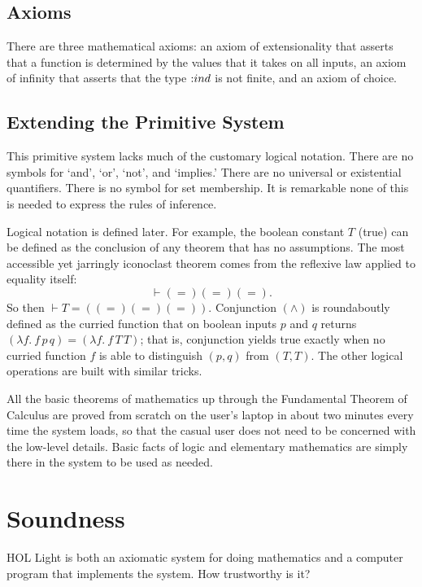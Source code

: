 \documentclass{llncs}
\def\tc{\hbox{:}}
\begin{document}
\subsection{Axioms}

There are three mathematical axioms: an axiom of extensionality that asserts
that a function is determined by the values that it takes on all inputs,
an axiom of infinity that asserts that the type $\tc ind$ is not finite, and an axiom of choice.

\subsection{Extending the Primitive System}

This primitive system 
lacks much of the customary logical notation.
There are no symbols for 
`and', `or', `not', and `implies.'  There are no universal or existential quantifiers.  There is no symbol for set membership.  
It is remarkable none of this is needed to express the rules of inference.

Logical notation
is defined later.
For example, the boolean constant $T$ (true) can be defined as the conclusion of
any theorem that has no assumptions.  The most accessible yet jarringly iconoclast
theorem comes from the reflexive law applied to equality itself:
$$
\vdash ( = ) ( = ) ( = ).
$$
So then $\vdash T = ((=) (=) (=))$.  Conjunction $( \land )$
is roundaboutly defined as the
curried function %
 that on boolean inputs $p$ and $q$
returns $(\lambda f.\ f\, p\, q) = (\lambda f.\ f\, T\, T)$; that is,
conjunction yields  true exactly when no curried function $f$ is able to
distinguish $(p,q)$ from
$(T,T)$.
The other logical operations are built with similar tricks.

All the basic theorems of mathematics up through the Fundamental Theorem of Calculus are proved from scratch on the user's laptop in about two minutes every time the system loads, so
that the casual user does not need to be concerned with the low-level details.
Basic facts of logic and elementary mathematics are simply there in the system
to be used as needed.


\section{Soundness}

HOL Light is both an axiomatic system for doing mathematics and a computer program that implements the system.
How trustworthy is it?
\end{document}
